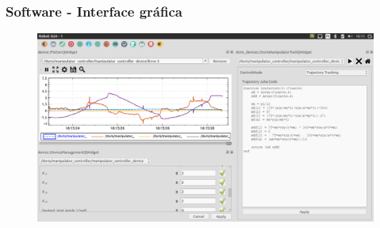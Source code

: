 \documentclass{beamer}
\begin{document}
\begin{frame}
\frametitle{Software - Interface gráfica}
\begin{figure}
\includegraphics[width=\linewidth]{./img/screenshot/sc1.png}
\end{figure}
\end{frame}


\end{document}
